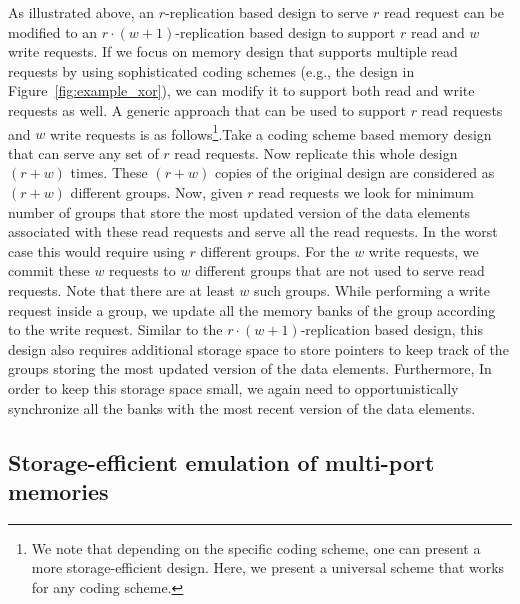 \begin{remark}
\label{rem:rw}
As illustrated above, an $r$-replication based design to serve $r$ read request can be modified to an $r\cdot(w+1)$-replication based design to support $r$ read and $w$ write requests. If we focus on memory design that supports multiple read requests by using sophisticated coding schemes (e.g., the design in Figure~\ref{fig:example_xor}), we can modify it to support both read and write requests as well. A generic approach that can be used to support $r$ read requests and $w$ write requests is as follows\footnote{We note that depending on the specific coding scheme, one can present a more storage-efficient design. Here, we present a universal scheme that works for any coding scheme.}.Take a coding scheme based memory design that can serve any set of $r$ read requests. Now replicate this whole design $(r + w)$ times. These $(r + w)$ copies of the original design are considered as $(r + w)$ different groups. Now, given $r$ read requests we look for minimum number of groups that store the most updated version of the data elements associated with these read requests and serve all the read requests. In the worst case this would require using $r$ different groups. For the $w$ write requests, we commit these $w$ requests to $w$ different groups that are not used to serve read requests. Note that there are at least $w$ such groups. While performing a write request inside a group, we update all the memory banks of the group according to the write request. Similar to the $r\cdot(w + 1)$-replication based design, this design also requires additional storage space to store pointers to keep track of the groups storing the most  updated version of the data elements. Furthermore, In order to keep this storage space small, we again need to opportunistically synchronize all the banks with the most recent version of the data elements.
\end{remark}

\subsection{Storage-efficient emulation of multi-port memories}
\label{sec:efficient_emulation}

